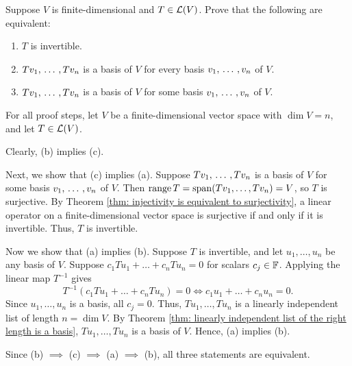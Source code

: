 \begin{xrcs}
  Suppose $V$ is finite-dimensional and $T \in \mathcal{L}(V)$. Prove that the following are equivalent:
  \begin{enumerate}
    \item $T$ is invertible.
    \item $T v_1, {\, \ldots \,\,}, T v_n$ is a basis of $V$ for every basis $v_1, {\, \ldots \,\,}, v_n$ of $V$.
    \item $T v_1, {\, \ldots \,\,}, T v_n$ is a basis of $V$ for some basis $v_1, {\, \ldots \,\,}, v_n$ of $V$.
  \end{enumerate}

  \begin{xprf}
    For all proof steps, let $V$ be a finite-dimensional vector space with $\dim V = n$, and let $T \in \mathcal{L}(V)$.

    \StepOne Clearly, (b) implies (c).

    \StepTwo Next, we show that (c) implies (a). Suppose $Tv_1, {\, \ldots \,\,}, Tv_n$ is a basis of $V$ for some basis $v_1, {\, \ldots \,\,}, v_n$ of $V$.
    Then $\operatorname{range} T = \operatorname{span} (Tv_1, \dots, Tv_n) = V$, so $T$ is surjective.
    By Theorem \ref{thm: injectivity is equivalent to surjectivity}, a linear operator on a finite-dimensional vector space is surjective if and only if it is invertible.
    Thus, $T$ is invertible.

    \StepThree Now we show that (a) implies (b). Suppose $T$ is invertible, and let $u_1, \dots, u_n$ be any basis of $V$.
    Suppose $c_1 Tu_1 + \dots + c_n Tu_n = 0$ for scalars $c_j \in \mathbb{F}$.
    Applying the linear map $T^{-1}$ gives
    \begin{equation}
      T^{-1}(c_1 Tu_1 + \dots + c_n Tu_n) = 0 \iff c_1 u_1 + \dots + c_n u_n = 0.
    \end{equation}
    Since $u_1, \dots, u_n$ is a basis, all $c_j = 0$.
    Thus, $Tu_1, \dots, Tu_n$ is a linearly independent list of length $n = \dim V$.
    By Theorem \ref{thm: linearly independent list of the right length is a basis}, $Tu_1, \dots, Tu_n$ is a basis of $V$.
    Hence, (a) implies (b).

    Since (b) $\implies$ (c) $\implies$ (a) $\implies$ (b), all three statements are equivalent.
  \end{xprf}
\end{xrcs}

